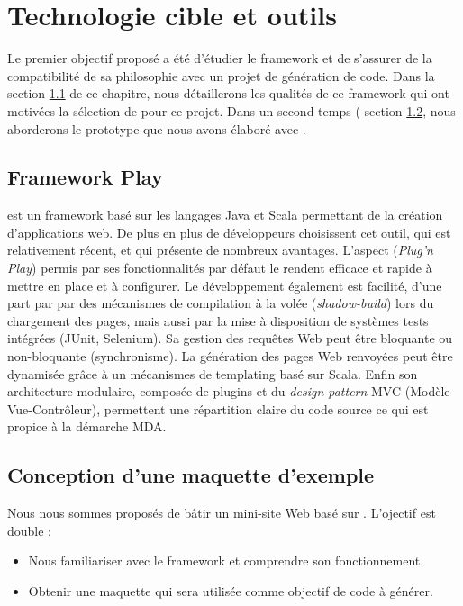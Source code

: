 \chapter{Technologie cible et outils}\label{chap:met}
Le premier objectif proposé a été d'étudier le framework \kwplay et de s'assurer de la compatibilité de sa philosophie avec un projet de génération de code. Dans la section \ref{sec:pla} de ce chapitre, nous détaillerons les qualités de ce framework qui ont motivées la sélection de \kwplay pour ce projet. Dans un second temps (\cf{} section \ref{sec:pro}, nous aborderons le prototype que nous avons élaboré avec \kwplay. 


\section{Framework Play}\label{sec:pla}
\kwplay{} est un framework basé sur les langages Java et Scala permettant de la création d'applications web. De plus en plus de développeurs choisissent cet outil, qui est relativement récent, et qui présente de nombreux avantages. L'aspect  (\textit{Plug'n Play}) permis par ses fonctionnalités par défaut le rendent efficace et rapide à mettre en place et à configurer. Le développement également est facilité, d'une part par par des mécanismes de compilation à la volée (\textit{shadow-build}) lors du chargement des pages, mais aussi par la mise à disposition de systèmes tests intégrées (JUnit, Selenium). Sa gestion des requêtes Web peut être bloquante ou non-bloquante (synchronisme). La génération des pages Web renvoyées peut être dynamisée grâce à un mécanismes de templating basé sur Scala. Enfin son architecture modulaire, composée de plugins et du \textit{design pattern} MVC (Modèle-Vue-Contrôleur), permettent une répartition claire du code source ce qui est propice à la démarche MDA. 






\section{Conception d’une maquette d’exemple}\label{sec:pro}

Nous nous sommes proposés de bâtir un mini-site Web basé sur \kwplay. L'ojectif est double :
\begin{itemize}
\item Nous familiariser avec le framework \kwplay et comprendre son fonctionnement.
\item Obtenir une maquette qui sera utilisée comme objectif de code à générer.
\end{itemize}

